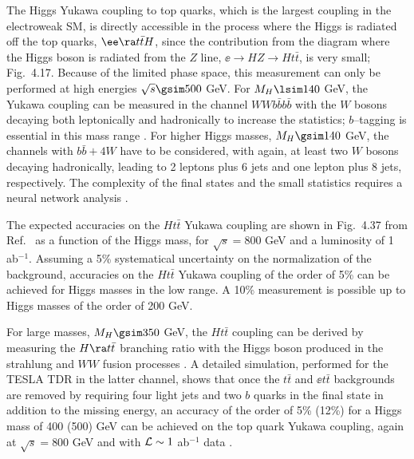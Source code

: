 The Higgs Yukawa coupling to top quarks, which is the largest coupling in the
electroweak SM, is directly accessible in the process where the Higgs is
radiated off the top quarks, $\ee \ra t\bar{t}H$, since the contribution from
the diagram where the Higgs boson is radiated from the $Z$ line,  $\ee \to HZ
\to Ht\bar{t}$, is very small; Fig.~4.17. Because of the limited phase space,
this measurement can only be performed at high energies $\sqrt{s} \gsim 500$
GeV.  For $M_H \lsim 140$ GeV, the Yukawa coupling  can be measured in the
channel $W Wb\bar{b}b\bar{b}$ with the $W$ bosons decaying both leptonically
and hadronically to increase the statistics; $b$--tagging is essential in this
mass range \cite{Strasbourg,ee-ttH-exp}. For higher Higgs masses,  $M_H
\gsim 140$ GeV, the channels with $b\bar b+4W$ have to be considered, with
again, at least two $W$ bosons decaying hadronically, leading to 2 leptons plus
6 jets and one lepton plus 8 jets, respectively. The complexity of the final
states and the small statistics requires a neural network analysis
\cite{Strasbourg}.

\centerline{}
\vspace*{-.cm}
 \s

The expected accuracies on the $H t \bar t$ Yukawa coupling are shown in
Fig.~4.37 from Ref.~\cite{Strasbourg} as a function of the Higgs mass, for
$\sqrt s = 800$ GeV and a luminosity of 1 ab$^{-1}$. Assuming a 5\%
systematical uncertainty on the normalization of the background, accuracies on
the $Ht\bar t$ Yukawa coupling of the order of 5\% can be achieved for Higgs
masses in the low range. A 10\% measurement is possible up to Higgs masses of
the order of 200 GeV. \s 

For large masses, $M_H \gsim 350$ GeV, the $Ht \bar{t}$ coupling can be derived
by measuring the $H \ra t\bar{t}$ branching ratio with the Higgs boson produced
in the strahlung and $WW$ fusion processes \cite{Hagiwara,Hagiwara0}. A 
detailed 
simulation, performed for the TESLA TDR in the latter channel, shows that
once the $t\bar t$ and $\ee t\bar t$ backgrounds are removed by requiring four 
light jets and two $b$ quarks in the final state in addition to the missing 
energy, an accuracy of the order of 5\% (12\%) for a Higgs mass of 400 (500) 
GeV can be achieved on the top quark Yukawa coupling, again at $\sqrt{s}= 
800$ GeV and with ${\cal L} \sim 1$  ab$^{-1}$ data \cite{Httexp}. 


